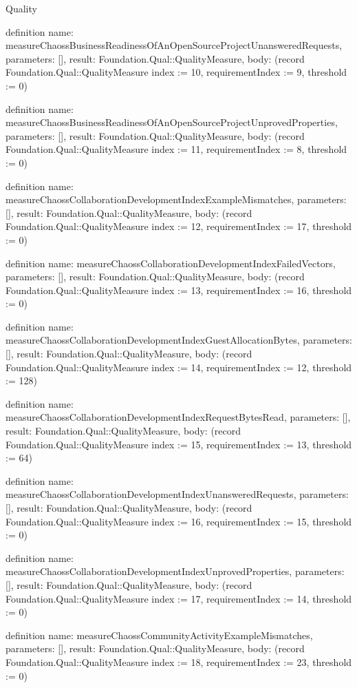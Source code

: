 \begin{lexlean}{Quality}
\begin{semanticmodule}
definition{
  name: measureChaossBusinessReadinessOfAnOpenSourceProjectUnansweredRequests,
  parameters: [],
  result: Foundation.Qual::QualityMeasure,
  body: (record Foundation.Qual::QualityMeasure {index := 10, requirementIndex := 9, threshold := 0})
}

definition{
  name: measureChaossBusinessReadinessOfAnOpenSourceProjectUnprovedProperties,
  parameters: [],
  result: Foundation.Qual::QualityMeasure,
  body: (record Foundation.Qual::QualityMeasure {index := 11, requirementIndex := 8, threshold := 0})
}

definition{
  name: measureChaossCollaborationDevelopmentIndexExampleMismatches,
  parameters: [],
  result: Foundation.Qual::QualityMeasure,
  body: (record Foundation.Qual::QualityMeasure {index := 12, requirementIndex := 17, threshold := 0})
}

definition{
  name: measureChaossCollaborationDevelopmentIndexFailedVectors,
  parameters: [],
  result: Foundation.Qual::QualityMeasure,
  body: (record Foundation.Qual::QualityMeasure {index := 13, requirementIndex := 16, threshold := 0})
}

definition{
  name: measureChaossCollaborationDevelopmentIndexGuestAllocationBytes,
  parameters: [],
  result: Foundation.Qual::QualityMeasure,
  body: (record Foundation.Qual::QualityMeasure {index := 14, requirementIndex := 12, threshold := 128})
}

definition{
  name: measureChaossCollaborationDevelopmentIndexRequestBytesRead,
  parameters: [],
  result: Foundation.Qual::QualityMeasure,
  body: (record Foundation.Qual::QualityMeasure {index := 15, requirementIndex := 13, threshold := 64})
}

definition{
  name: measureChaossCollaborationDevelopmentIndexUnansweredRequests,
  parameters: [],
  result: Foundation.Qual::QualityMeasure,
  body: (record Foundation.Qual::QualityMeasure {index := 16, requirementIndex := 15, threshold := 0})
}

definition{
  name: measureChaossCollaborationDevelopmentIndexUnprovedProperties,
  parameters: [],
  result: Foundation.Qual::QualityMeasure,
  body: (record Foundation.Qual::QualityMeasure {index := 17, requirementIndex := 14, threshold := 0})
}

definition{
  name: measureChaossCommunityActivityExampleMismatches,
  parameters: [],
  result: Foundation.Qual::QualityMeasure,
  body: (record Foundation.Qual::QualityMeasure {index := 18, requirementIndex := 23, threshold := 0})
}


\end{semanticmodule}
\end{lexlean}
